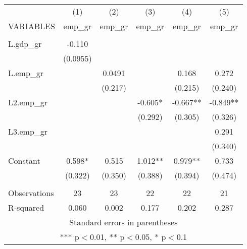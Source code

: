 \documentclass[]{article}
\begin{document}
\begin{tabular}{lccccc} \hline
 & (1) & (2) & (3) & (4) & (5) \\
VARIABLES & emp\_gr & emp\_gr & emp\_gr & emp\_gr & emp\_gr \\ \hline
 &  &  &  &  &  \\
L.gdp\_gr & -0.110 &  &  &  &  \\
 & (0.0955) &  &  &  &  \\
L.emp\_gr &  & 0.0491 &  & 0.168 & 0.272 \\
 &  & (0.217) &  & (0.215) & (0.240) \\
L2.emp\_gr &  &  & -0.605* & -0.667** & -0.849** \\
 &  &  & (0.292) & (0.305) & (0.326) \\
L3.emp\_gr &  &  &  &  & 0.291 \\
 &  &  &  &  & (0.340) \\
Constant & 0.598* & 0.515 & 1.012** & 0.979** & 0.733 \\
 & (0.322) & (0.350) & (0.388) & (0.394) & (0.474) \\
 &  &  &  &  &  \\
Observations & 23 & 23 & 22 & 22 & 21 \\
 R-squared & 0.060 & 0.002 & 0.177 & 0.202 & 0.287 \\ \hline
\multicolumn{6}{c}{ Standard errors in parentheses} \\
\multicolumn{6}{c}{ *** p$<$0.01, ** p$<$0.05, * p$<$0.1} \\
\end{tabular}
\end{document}
